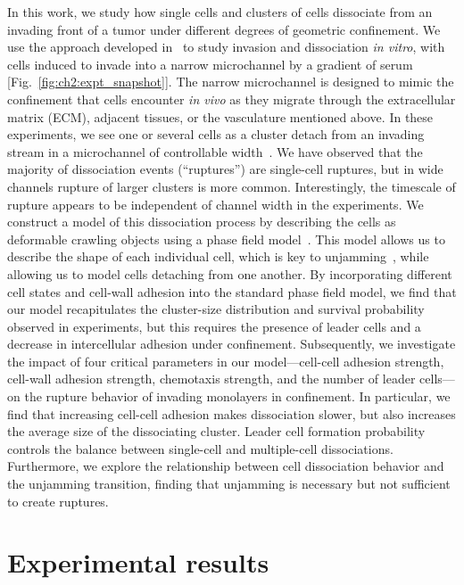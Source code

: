 In this work, we study how single cells and clusters of cells dissociate from an invading front of a tumor under different degrees of geometric confinement.
We use the approach developed in~\cite{law2023cytokinesis} to study invasion and dissociation \textit{in vitro}, with cells induced to invade into a narrow microchannel by a gradient of serum [Fig.~\ref{fig:ch2:expt_snapshot}].
The narrow microchannel is designed to mimic the confinement that cells encounter \textit{in vivo} as they migrate through the extracellular matrix (ECM), adjacent tissues, or the vasculature mentioned above.
In these experiments, we see one or several cells as a cluster detach from an invading stream in a microchannel of controllable width~\cite{law2023cytokinesis}.
We have observed that the majority of dissociation events (``ruptures'') are single-cell ruptures, but in wide channels rupture of larger clusters is more common.
Interestingly, the timescale of rupture appears to be independent of channel width in the experiments.
We construct a model of this dissociation process by describing the cells as deformable crawling objects using a phase field model~\cite{loewe2020solid, perez2024deposited}.
This model allows us to describe the shape of each individual cell, which is key to unjamming~\cite{loewe2020solid, zhang2020active, chiang2024multiphase, bi2016motility}, while allowing us to model cells detaching from one another.
By incorporating different cell states and cell-wall adhesion into the standard phase field model, we find that our model recapitulates the cluster-size distribution and survival probability observed in experiments, but this requires the presence of leader cells and a decrease in intercellular adhesion under confinement.
Subsequently, we investigate the impact of four critical parameters in our model---cell-cell adhesion strength, cell-wall adhesion strength, chemotaxis strength, and the number of leader cells---on the rupture behavior of invading monolayers in confinement.
In particular, we find that increasing cell-cell adhesion makes dissociation slower, but also increases the average size of the dissociating cluster.
Leader cell formation probability controls the balance between single-cell and multiple-cell dissociations.
Furthermore, we explore the relationship between cell dissociation behavior and the unjamming transition, finding that unjamming is necessary but not sufficient to create ruptures.


\section{Experimental results}
\label{sec:ch2:expt}

